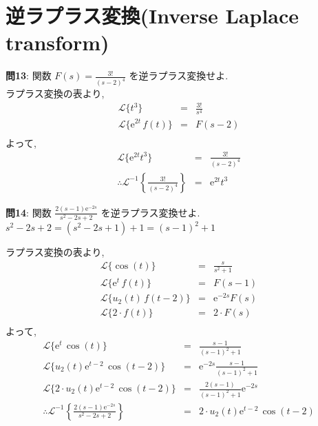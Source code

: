 ﻿\documentclass[a4j]{jarticle}
\begin{document}
\section{逆ラプラス変換(Inverse Laplace transform)}
%
\noindent
{\large {\bf 問13}}: 関数 \( F(s) = \frac{3!}{(s-2)^4} \) を逆ラプラス変換せよ. \\

ラプラス変換の表より,
\begin{eqnarray*}
                  \mathcal{L} \{ t^3 \} &=& \frac{3!}{s^4} \\
\mathcal{L} \{ \mathrm{e}^{2t}\,f(t) \} &=& F(s-2) \\
\end{eqnarray*}
よって,
\begin{eqnarray*}
                  \mathcal{L} \{ \mathrm{e}^{2t}t^3 \}                 &=& \frac{3!}{(s-2)^4} \\
\therefore        \mathcal{L}^{-1} \left\{ \frac{3!}{(s-2)^4} \right\} &=& \mathrm{e}^{2t}t^3
\end{eqnarray*}

\noindent
{\large {\bf 問14}}: 関数 \( \frac{2(s-1)\mathrm{e}^{-2s}}{s^2-2s+2} \) を逆ラプラス変換せよ. \\

\( s^2-2s+2 = (s^2-2s+1)+1 = (s-1)^2 + 1 \)

ラプラス変換の表より,
\begin{eqnarray*}
              \mathcal{L} \{ \cos(t) \} &=& \frac{s}{s^2 + 1} \\
 \mathcal{L} \{ \mathrm{e}^{t}\,f(t) \} &=& F(s-1) \\
       \mathcal{L} \{ u_2(t)\,f(t-2) \} &=& \mathrm{e}^{-2s}F(s) \\
       \mathcal{L} \{ 2\cdot f(t) \} &=& 2 \cdot F(s) \\
\end{eqnarray*}
よって,
\begin{eqnarray*}
                \mathcal{L} \{ \mathrm{e}^{t}\,\cos(t) \} &=& \frac{s-1}{(s-1)^2+1} \\
      \mathcal{L} \{ u_2(t)\mathrm{e}^{t-2}\,\cos(t-2) \} &=& \mathrm{e}^{-2s}\frac{s-1}{(s-1)^2+1} \\
\mathcal{L} \{ 2\cdot u_2(t)\mathrm{e}^{t-2}\,\cos(t-2) \} &=& \frac{2(s-1)}{(s-1)^2+1}\mathrm{e}^{-2s} \\
\therefore \mathcal{L}^{-1} \left\{ \frac{2(s-1)\mathrm{e}^{-2s}}{s^2-2s+2} \right\} &=& 2\cdot u_2(t)\mathrm{e}^{t-2}\,\cos(t-2)
\end{eqnarray*}
\end{document}

